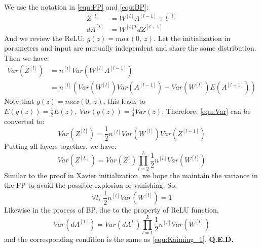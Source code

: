 \begin{prf}
    We use the notation in \autoref{equ:FP} and \autoref{equ:BP}:
    \begin{align*}
        Z^{[l]} & = W^{[l]}A^{[l-1]} + b^{[l]} \\
        dA^{[l]} & = W^{[l]T}dZ^{[l+1]}
    \end{align*} 
    And we review the ReLU: $ g(z) = max(0,\ z) $.
    Let the initialization in parameters and input are mutually independent 
    and share the same distribution. Then we have:
    \begin{equation}
        \label{equ:Var}
        \begin{split}
            Var(Z^{[l]}) & = n^{[l]}Var(W^{[l]}A^{[l-1]}) \\
            & = n^{[l]}(Var(W^{[l]})Var(A^{[l-1]}) + Var(W^{[l]})E(A^{[l-1]}))
        \end{split}
    \end{equation}
    Note that $ g(z) = max(0,\ z) $, this leads to $ E(g(z)) = \frac{1}{2}E(z),\ 
    Var(g(z)) = \frac{1}{4}Var(z) $. Therefore, \autoref{equ:Var} can be converted
    to:
    \begin{equation}
        Var(Z^{[l]}) = \frac{1}{2}n^{[l]}Var(W^{[l]})Var(Z^{[l-1]})
    \end{equation}
    Putting all layers together, we have:
    \begin{equation}
        Var(Z^{[L]}) = Var(Z^{1})\prod\limits_{l=2}^L\frac{1}{2}n^{[l]}Var(W^{[l]})
    \end{equation}
    Similar to the proof in Xavier initialization, we hope the maintain the 
    variance in the FP to avoid the possible explosion or vanishing.
    So, 
    \begin{equation}
        \label{equ:Kaiming_1}
        \forall l,\ \frac{1}{2}n^{[l]}Var(W^{[l]}) = 1
    \end{equation}
    Likewise in the process of BP, due to the property of ReLU function, 
    \begin{equation}
        Var(dA^{[1]}) = Var(dA^{L})\prod\limits_{l=1}^L\frac{1}{2}n^{[l]}Var(W^{[l]})
    \end{equation}
    and the corresponding condition is the same as \autoref{equ:Kaiming_1}.
    \textbf{Q.E.D.}
\end{prf}

